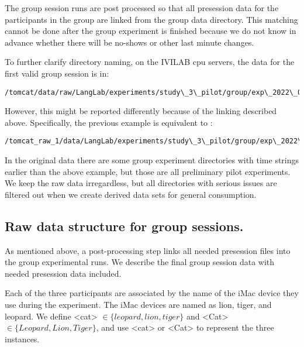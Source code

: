The group session runs are post processed so that all presession data for the
participants in the group are linked from the group data directory. This
matching cannot be done after the group experiment is finished because we do not
know in advance whether there will be no-shows or other last minute changes.

To further clarify directory naming, on the IVILAB cpu servers,
the data for the first valid group session
is in:
\begin{lstlisting}
/tomcat/data/raw/LangLab/experiments/study\_3\_pilot/group/exp\_2022\_09\_30\_10
\end{lstlisting}
However, this might be reported  differently because of the linking described
above. Specifically, the previous example is equivalent to :
\begin{lstlisting}
/tomcat_raw_1/data/LangLab/experiments/study\_3\_pilot/group/exp\_2022\_09\_30\_10
\end{lstlisting}
In the original data there are some group experiment directories with time
strings earlier than the above example, but those are all preliminary pilot
experiments. We keep the raw data irregardless, but all directories with serious
issues are filtered out when we create derived data sets for general
consumption.

\subsection{Raw data structure for group sessions.}

As mentioned above, a post-processing step links all needed presession files into
the group experimental runs. We describe the final group session data with
needed presession data included.


Each of the three participants are associated by the name of the iMac device
they use during the experiment.
The iMac devices are named as lion, tiger, and
leopard. We define
<cat> $\in \{leopard, lion, tiger\}$
and <Cat> $\in \{Leopard, Lion, Tiger\}$,
and use <cat> or <Cat> to represent the three instances.



